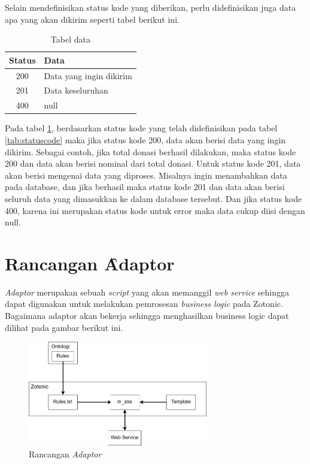 	Selain mendefinisikan status kode yang diberikan, perlu didefinisikan juga data apa yang akan dikirim seperti tabel berikut ini.
	
	\begin{table}
		\centering
		\caption{Tabel data}
		\label{tab:tabelData}
		\begin{tabular}{| c | l |}
			\hline
			Status & Data \\ 
			\hline
			200 & Data yang ingin dikirim \\
			201 & Data keseluruhan \\
			400 & null\\
			\hline
		\end{tabular}
	\end{table}

	Pada tabel \ref{tab:tabelData}, berdasarkan status kode yang telah didefinisikan pada tabel \ref{tab:statuscode} maka jika status kode 200, data akan berisi data yang ingin dikirim. Sebagai contoh, jika total donasi berhasil dilakukan, maka status kode 200 dan data akan berisi nominal dari total donasi. Untuk status kode 201, data akan berisi mengenai data yang diproses. Misalnya ingin menambahkan data pada database, dan jika berhasil maka status kode 201 dan data akan berisi seluruh data yang dimasukkan ke dalam database tersebut. Dan jika status kode 400, karena ini merupakan status kode untuk error maka data cukup diisi dengan null.
\section{Rancangan \f{Adaptor}}

\textit{Adaptor} merupakan sebuah \textit{script} yang akan memanggil \textit{web service} sehingga dapat digunakan untuk melakukan pemrosesan \textit{business logic} pada Zotonic. Bagaimana adaptor akan bekerja sehingga menghasilkan business logic dapat dilihat pada gambar berikut ini.

\begin{figure}
	\centering
	\includegraphics[width=0.7\textwidth]
		{pics/adaptor.jpg}
	\caption{Rancangan \textit{Adaptor}}
	\label{fig:adaptor}
\end{figure}
\vspace{-0.3cm}


